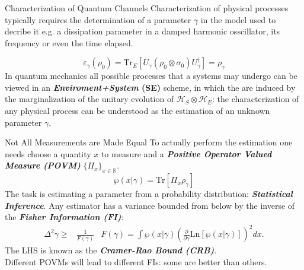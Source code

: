 \documentclass[final]{beamer}
\newlength{\colwidth}
\begin{document}
\begin{frame}[t]
\begin{columns}[t]
\begin{column}{\colwidth}
  \begin{block}{Characterization of Quantum Channels}
  Characterization of physical processes typically requires the determination of a parameter $\gamma$ in the model used to decribe it e.g.
  a dissipation parameter in a damped harmonic osscillator, its frequency or even the time elapsed.%
\vspace{-0.04\linewidth}
  
 \vspace{-0.15\linewidth}
{\Large
  \begin{equation*}
       \varepsilon_{\gamma}\left(\rho_{0}\right)=\mathrm{Tr}_{E}\left[ U_{\gamma}\left( \rho_{0} \otimes \sigma_{0} \right)U_{\gamma}^{\dagger}\right]=\rho_{\gamma}
  \end{equation*}
}
  In quantum mechanics all possible processes that a systems may undergo can be viewed in an \textbf{\textit{Enviroment+System} (SE)} scheme,
in which the  are induced by the marginalization of the unitary evolution of
$\mathcal{H}_{S}\otimes\mathcal{H}_{E}$: the characterization of any physical process can be understood as the estimation of an unknown parameter $\gamma$.
  \end{block}
  \begin{block}{Not All Measurements are Made Equal}
    To actually perform the estimation one needs choose a quantity $x$ to measure and a \textbf{\textit{Positive
      Operator Valued Measure (POVM)}} $\{\Pi_{x}\}_{x \in \mathbb{R}}$.\\
   \begin{equation*}
     \wp(x | \gamma)= \mathrm{Tr}\left[\Pi_{x} \rho_{\gamma}\right]
   \end{equation*}
The task is estimating a parameter from a probability
distribution: \textit{\textbf{Statistical Inference}}.
Any estimator has a variance bounded from below by the inverse of the \textit{\textbf{Fisher Information (FI)}}:
  \begin{align*}
    \Delta^{2}\gamma \geq & \frac{1}{F(\gamma)} & F(\gamma) = \int  \wp(x | \gamma) \left(\frac{\partial}{\partial\gamma} \mathrm{Ln}  [\wp(x |\gamma)]\right)^{2} dx.
  \end{align*}
The LHS is known as the \textit{\textbf{Cramer-Rao Bound (CRB)}}.\\
Different POVMs will lead to different FIs: some are better than others.
\end{block}


\end{column}
\end{columns}
\end{frame}
\end{document}
